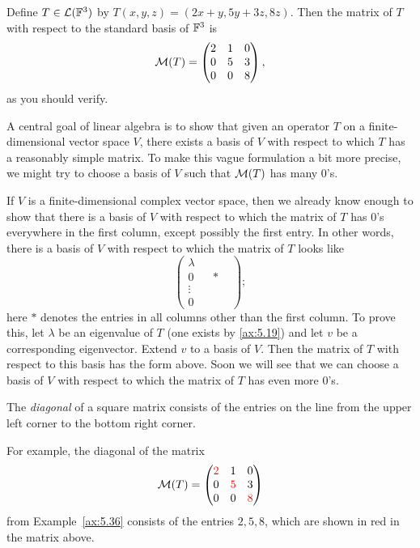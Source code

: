 \begin{example}\label{ax:5.36}
Define $T\in\mathcal{L}(\mathbb{F}^3)$ by $T(x,y,z)=(2x+y,5y+3z,8z)$. Then the matrix of $T$
with respect to the standard basis of $\mathbb{F}^3$ is
\[ \mathcal{M}(T) = \begin{pmatrix} 2&1&0\\ 0&5&3\\ 0&0&8 \end{pmatrix}, \]
as you should verify.
\end{example}

A central goal of linear algebra is to show that given an operator $T$ on a
finite-dimensional vector space $V$, there exists a basis of $V$ with respect to
which $T$ has a reasonably simple matrix. To make this vague formulation a bit
more precise, we might try to choose a basis of $V$ such that $\mathcal{M}(T)$ has many
$0$'s.

If $V$ is a finite-dimensional complex vector space, then we already know enough
to show that there is a basis of $V$ with respect to which the matrix of $T$ has
$0$'s everywhere in the first column, except possibly the first entry. In other
words, there is a basis of $V$ with respect to which the matrix of $T$ looks like
\[ \begin{pmatrix} \lambda & & & \\ 0 & & * & \\ \vdots & & & \\ 0 & & &
   \end{pmatrix}; \]
here $*$ denotes the entries in all columns other than the first column. To prove
this, let $\lambda$ be an eigenvalue of $T$ (one exists by \ref{ax:5.19}) and let
$v$ be a corresponding eigenvector. Extend $v$ to a basis of $V$. Then the matrix
of $T$ with respect to this basis has the form above. Soon we will see that we
can choose a basis of $V$ with respect to which the matrix of $T$ has even more
$0$'s.

\begin{definition}\label{ax:5.37}
The \emph{diagonal} of a square matrix consists of the entries on the line from
the upper left corner to the bottom right corner.
\end{definition}

For example, the diagonal of the matrix
\[ \mathcal{M}(T) = \begin{pmatrix} \textcolor{red}{2}&1&0\\ 0&\textcolor{red}{5}&3\\
   0&0&\textcolor{red}{8} \end{pmatrix} \]
from Example~\ref{ax:5.36} consists of the entries $2,5,8$, which are shown in
red in the matrix above.

